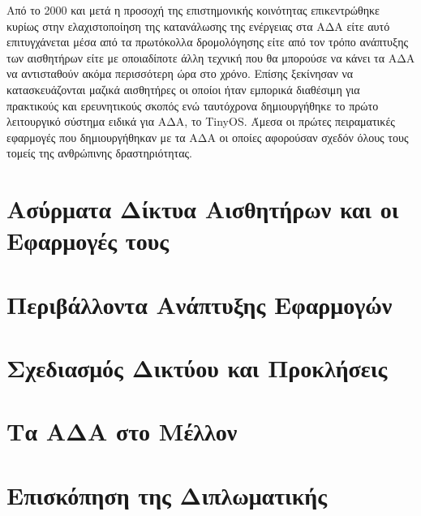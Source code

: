 Από το 2000 και μετά η προσοχή της επιστημονικής κοινότητας επικεντρώθηκε κυρίως στην ελαχιστοποίηση της κατανάλωσης της ενέργειας στα ΑΔΑ είτε αυτό επιτυγχάνεται
μέσα από τα πρωτόκολλα δρομολόγησης είτε από τον τρόπο ανάπτυξης των αισθητήρων είτε με οποιαδίποτε άλλη τεχνική που θα μπορούσε να κάνει τα ΑΔΑ να αντισταθούν ακόμα
περισσότερη ώρα στο χρόνο.
Επίσης ξεκίνησαν να κατασκευάζονται μαζικά αισθητήρες οι οποίοι ήταν εμπορικά διαθέσιμη για πρακτικούς και ερευνητικούς σκοπός ενώ ταυτόχρονα δημιουργήθηκε το πρώτο
λειτουργικό σύστημα ειδικά για ΑΔΑ, το TinyOS.
Άμεσα οι  πρώτες πειραματικές εφαρμογές που δημιουργήθηκαν με τα ΑΔΑ οι οποίες αφορούσαν σχεδόν όλους τους τομείς της ανθρώπινης δραστηριότητας.

\section{Ασύρματα Δίκτυα Αισθητήρων και οι Εφαρμογές τους}


\section{Περιβάλλοντα Ανάπτυξης Εφαρμογών}

\section{Σχεδιασμός Δικτύου και Προκλήσεις}

\section{Τα ΑΔΑ στο Μέλλον}
\section{Επισκόπηση της Διπλωματικής}

\label{ch:wsns}